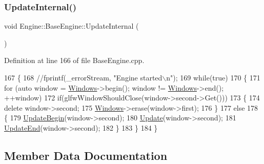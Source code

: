 \subsubsection{\texorpdfstring{Update\+Internal()}{UpdateInternal()}}
{\footnotesize\ttfamily void Engine\+::\+Base\+Engine\+::\+Update\+Internal (\begin{DoxyParamCaption}{ }\end{DoxyParamCaption})\hspace{0.3cm}{\ttfamily [private]}}



Definition at line 166 of file Base\+Engine.\+cpp.


\begin{DoxyCode}
167 \{
168     \textcolor{comment}{//fprintf(\_errorStream, "Engine started\(\backslash\)n");}
169     \textcolor{keywordflow}{while}(\textcolor{keyword}{true})
170     \{
171         \textcolor{keywordflow}{for} (\textcolor{keyword}{auto} window = \mbox{\hyperlink{classEngine_1_1BaseEngine_a4a1a4c4dae052e66ecc4f326eeed4d33}{Windows}}->begin(); window != \mbox{\hyperlink{classEngine_1_1BaseEngine_a4a1a4c4dae052e66ecc4f326eeed4d33}{Windows}}->end(); ++window)
172             \textcolor{keywordflow}{if}(glfwWindowShouldClose(window->second->Get()))
173             \{
174                 \textcolor{keyword}{delete} window->second;
175                 \mbox{\hyperlink{classEngine_1_1BaseEngine_a4a1a4c4dae052e66ecc4f326eeed4d33}{Windows}}->erase(window->first);
176             \}
177             \textcolor{keywordflow}{else}
178             \{
179                 \mbox{\hyperlink{classEngine_1_1BaseEngine_aace6be2a42d12b64fbd35f1acdb08408}{UpdateBegin}}(window->second);
180                 \mbox{\hyperlink{classEngine_1_1BaseEngine_a01c23c2073f08939a660f3b7a866852c}{Update}}(window->second);
181                 \mbox{\hyperlink{classEngine_1_1BaseEngine_a7c07c98e583df042a0eb01e0ddec85a1}{UpdateEnd}}(window->second);
182             \}
183     \}
184 \}
\end{DoxyCode}


\subsection{Member Data Documentation}
\mbox{\label{classEngine_1_1BaseEngine_a26fd54a1ee2733f9c654af5afcfa96cf}} 
